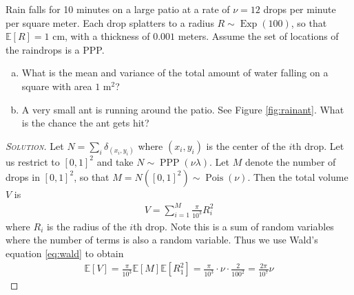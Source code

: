 \documentclass[11pt]{article}
\newenvironment{soln}{\begin{proof}[\textsc{Solution}]}{\renewcommand{\qedsymbol}{$\blacklozenge$}\end{proof}}
\begin{document}
\begin{example}\label{ex:ant}
	Rain falls for 10 minutes on a large patio at a rate of $\nu = 12$ drops per minute per square meter. Each drop splatters to a radius $R \sim \operatorname{Exp}(100)$, so that $\mathbb{E}[R] = 1\text{ cm}$, with a thickness of $0.001$ meters. Assume the set of locations of the raindrops is a PPP.
	\begin{enumerate}[(a)]
		\item What is the mean and variance of the total amount of water falling on a square with area $1 \text{ m}^2$?
		\item A very small ant is running around the patio. See Figure \ref{fig:rainant}. What is the chance the ant gets hit?
	\end{enumerate}

\begin{soln}
	Let $N = \sum_i \delta_{(x_i,y_i)}$ where $(x_i,y_i)$ is the center of the $i$th drop. Let us restrict to $[0,1]^2$ and take $N \sim \operatorname{PPP}(\nu \lambda)$. Let $M$ denote the number of drops in $[0,1]^2$, so that $M = N([0,1]^2) \sim \operatorname{Pois}(\nu)$. Then the total volume $V$ is 
	\begin{align}
		V = \sum_{i=1}^M \frac{\pi}{10^3}R_i^2
	\end{align}
	where $R_i$ is the radius of the $i$th drop. Note this is a sum of random variables where the number of terms is also a random variable. Thus we use Wald's equation \eqref{eq:wald} to obtain
	\begin{align}\label{eq:usewald}
		\mathbb{E}\left[ V \right] = \frac{\pi}{10^3}\mathbb{E}[M]\mathbb{E}[R_1^2] = \frac{\pi}{10^3}\cdot \nu \cdot \frac{2}{100^2} = \frac{2\pi}{10^7}\nu
	\end{align}
	

\end{soln}
\end{example}
\end{document}
